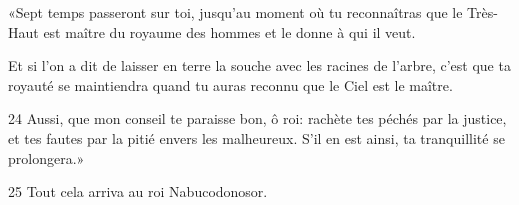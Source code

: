 
«Sept temps passeront sur toi, jusqu’au moment où tu reconnaîtras que le Très-Haut est maître du royaume des hommes et le donne à qui il veut.

Et si l’on a dit de laisser en terre la souche avec les racines de l’arbre, c’est que ta royauté se maintiendra quand tu auras reconnu que le Ciel est le maître.

24 Aussi, que mon conseil te paraisse bon, ô roi: rachète tes péchés par la justice, et tes fautes par la pitié envers les malheureux. S’il en est ainsi, ta tranquillité se prolongera.»

25 Tout cela arriva au roi Nabucodonosor.